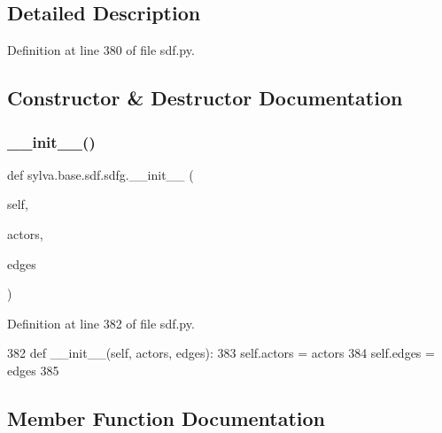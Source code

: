 \subsection{Detailed Description}


Definition at line 380 of file sdf.\+py.



\subsection{Constructor \& Destructor Documentation}
\mbox{\label{classsylva_1_1base_1_1sdf_1_1sdfg_ada06f4f9209867a6aed563cb4c8a62e4}} 
\subsubsection{\texorpdfstring{\+\_\+\+\_\+init\+\_\+\+\_\+()}{\_\_init\_\_()}}
{\footnotesize\ttfamily def sylva.\+base.\+sdf.\+sdfg.\+\_\+\+\_\+init\+\_\+\+\_\+ (\begin{DoxyParamCaption}\item[{}]{self,  }\item[{}]{actors,  }\item[{}]{edges }\end{DoxyParamCaption})}



Definition at line 382 of file sdf.\+py.


\begin{DoxyCode}
382         \textcolor{keyword}{def }\_\_init\_\_(self, actors, edges):
383             self.actors = actors
384             self.edges = edges
385 
\end{DoxyCode}


\subsection{Member Function Documentation}
\mbox{\label{classsylva_1_1base_1_1sdf_1_1sdfg_a56860c252c6363ef47c67a15d979f59f}} 
